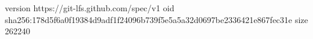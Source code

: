 version https://git-lfs.github.com/spec/v1
oid sha256:178d5f6a0f19384d9adf1f24096b739f5e5a5a32d0697be2336421e867fec31e
size 262240
